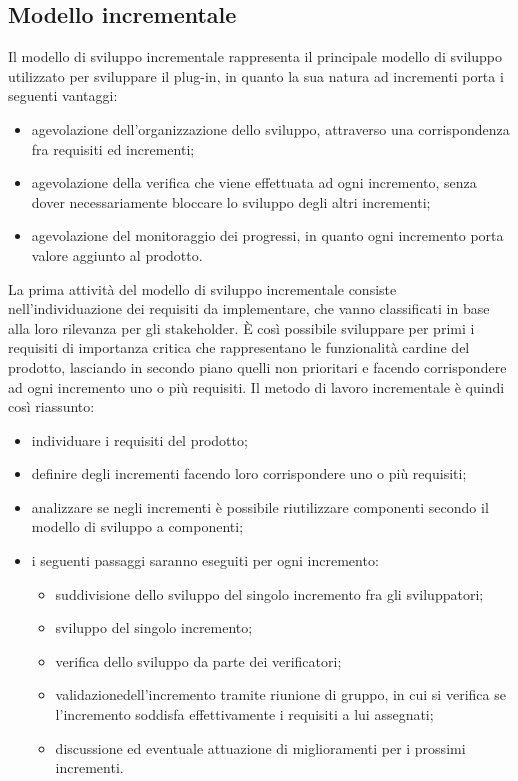 \subsection{Modello incrementale}
Il modello di sviluppo incrementale rappresenta il principale modello di sviluppo utilizzato per sviluppare il plug-in, in quanto la sua natura ad incrementi porta i seguenti vantaggi:
\begin{itemize}
	\item agevolazione dell'organizzazione dello sviluppo, attraverso una corrispondenza fra requisiti ed incrementi;
	\item agevolazione della verifica che viene effettuata ad ogni incremento, senza dover necessariamente bloccare lo sviluppo degli altri incrementi;
	\item agevolazione del monitoraggio dei progressi, in quanto ogni incremento porta valore aggiunto al prodotto\glo.
\end{itemize}
La prima attività del modello di sviluppo incrementale consiste nell'individuazione dei requisiti da implementare, che vanno classificati in base alla loro rilevanza per gli stakeholder\glo. È così possibile sviluppare per primi i requisiti di importanza critica che rappresentano le funzionalità cardine del prodotto\glo, lasciando in secondo piano quelli non prioritari e facendo corrispondere ad ogni incremento uno o più requisiti.
Il metodo di lavoro incrementale è quindi così riassunto:
\begin{itemize}
	\item individuare i requisiti del prodotto\glo;
	\item definire degli incrementi facendo loro corrispondere uno o più requisiti;
	\item analizzare se negli incrementi è possibile riutilizzare componenti secondo il modello di sviluppo a componenti;
	\item i seguenti passaggi saranno eseguiti per ogni incremento:
	\begin{itemize}
		\item suddivisione dello sviluppo del singolo incremento fra gli sviluppatori;
		\item sviluppo del singolo incremento;
		\item verifica dello sviluppo da parte dei verificatori;
		\item validazione\glosp dell'incremento tramite riunione di gruppo, in cui si verifica se l'incremento soddisfa effettivamente i requisiti a lui assegnati;
		\item discussione ed eventuale attuazione di miglioramenti per i prossimi incrementi.
	\end{itemize}
\end{itemize}

